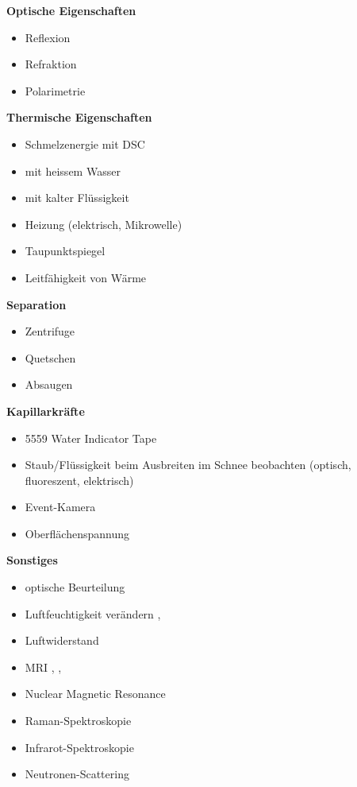 \textbf{Optische Eigenschaften}
\begin{itemize}
\item Reflexion
\item Refraktion
\item Polarimetrie
\end{itemize}

\textbf{Thermische Eigenschaften}
\begin{itemize}
\item Schmelzenergie mit DSC \cite{mt-density-meter}
\item mit heissem Wasser \cite{Fasani.2023}
\item mit kalter Flüssigkeit
\item Heizung (elektrisch, Mikrowelle)
\item Taupunktspiegel
\item Leitfähigkeit von Wärme
\end{itemize}

\textbf{Separation}
\begin{itemize}
\item Zentrifuge
\item Quetschen
\item Absaugen
\end{itemize}

\textbf{Kapillarkräfte}
\begin{itemize}
\item 5559 Water Indicator Tape
\item Staub/Flüssigkeit beim Ausbreiten im Schnee beobachten (optisch, fluoreszent, elektrisch) \cite{kennedylabs-download}
\item Event-Kamera
\item Oberflächenspannung \cite{AlamShibly.2017}
\end{itemize}

\textbf{Sonstiges}
\begin{itemize}
\item optische Beurteilung \cite{miro}
\item Luftfeuchtigkeit verändern \cite{joule-thomson-wiki}, \cite{sensirion-sht4xa-sensors}
\item Luftwiderstand
\item MRI \cite{Adachi.2020}, \cite{Nowogrodzki.2018}, \cite{Yamaguchi.2023}
\item Nuclear Magnetic Resonance
\item Raman-Spektroskopie \cite{Reichardt.2022}
\item Infrarot-Spektroskopie
\item Neutronen-Scattering \cite{Lombardo.2023}
\end{itemize}

